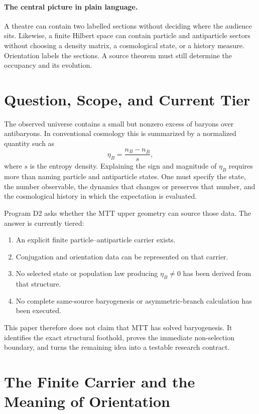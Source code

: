 \documentclass[11pt]{article}
\theoremstyle{definition}
\theoremstyle{remark}
\begin{document}
\paragraph{The central picture in plain language.}
A theatre can contain two labelled sections without deciding where the
audience sits.  Likewise, a finite Hilbert space can contain particle and
antiparticle sectors without choosing a density matrix, a cosmological state,
or a history measure.  Orientation labels the sections.  A source theorem
must still determine the occupancy and its evolution.

\tableofcontents
\newpage

\section{Question, Scope, and Current Tier}

The observed universe contains a small but nonzero excess of baryons over
antibaryons.  In conventional cosmology this is summarized by a normalized
quantity such as
\[
 \eta_B=\frac{n_B-n_{\bar B}}{s},
\]
where $s$ is the entropy density.  Explaining the sign and magnitude of
$\eta_B$ requires more than naming particle and antiparticle states.  One
must specify the state, the number observable, the dynamics that changes or
preserves that number, and the cosmological history in which the expectation
is evaluated.

Program D2 asks whether the MTT upper geometry can source those data.  The
answer is currently tiered:
\begin{enumerate}[label=\textbf{D2.\arabic*.}]
\item An explicit finite particle--antiparticle carrier exists.
\item Conjugation and orientation data can be represented on that carrier.
\item No selected state or population law producing $\eta_B\neq0$ has been
derived from that structure.
\item No complete same-source baryogenesis or asymmetric-branch calculation
has been executed.
\end{enumerate}

This paper therefore does not claim that MTT has solved baryogenesis.  It
identifies the exact structural foothold, proves the immediate non-selection
boundary, and turns the remaining idea into a testable research contract.

\section{The Finite Carrier and the Meaning of Orientation}
\end{document}
